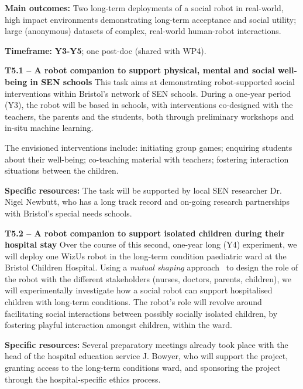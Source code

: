 \documentclass[11pt,a4paper]{report}
\newcommand{\project}{WizUs\xspace}
\begin{document}
\begin{framed}

    \textbf{Main outcomes:} Two long-term deployments of a social robot in
    real-world, high impact environments demonstrating long-term acceptance and
    social utility; large (anonymous) datasets of complex, real-world
    human-robot interactions.

    \textbf{Timeframe:} \textbf{Y3-Y5}; one post-doc (shared with WP4).

\end{framed}

\textbf{T5.1 -- A robot companion to support physical, mental and social
well-being in SEN schools} This task aims at demonstrating robot-supported
social interventions within Bristol's network of SEN schools.  During a one-year
period (Y3), the robot will be based in schools, with interventions co-designed
with the teachers, the parents and the students, both through preliminary
workshops and in-situ machine learning.

The envisioned interventions include: initiating group games; enquiring students
about their well-being; co-teaching material with teachers; fostering
interaction situations between the children.

\textbf{Specific resources:} The task will be supported by local SEN researcher
Dr. Nigel Newbutt, who has a long track record and on-going research
partnerships with Bristol's special needs schools.


\textbf{T5.2 -- A robot companion to support isolated children during their
hospital stay} Over the course of this second, one-year long (Y4)
experiment, we will deploy one \project robot in the long-term condition
paediatric ward at the Bristol Children Hospital.  Using a \emph{mutual shaping}
approach~\cite{winkle2018social} to design the role of the robot with the
different stakeholders (nurses, doctors, parents, children), we will
experimentally investigate how a social robot can support hospitalised children
with long-term conditions. The robot's role will revolve around facilitating
social interactions between possibly socially isolated children, by fostering
playful interaction amongst children, within the ward.

\textbf{Specific resources:} Several preparatory meetings already took place
with the head of the hospital education service J. Bowyer, who will support the
project, granting access to the long-term conditions ward, and sponsoring the
project through the hospital-specific ethics process.
\end{document}
